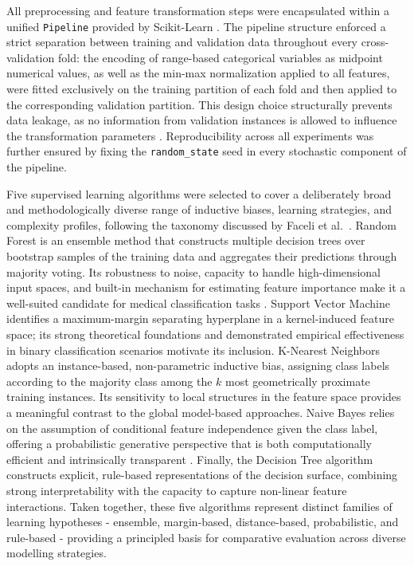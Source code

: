 All preprocessing and feature transformation steps were encapsulated within a unified
\texttt{Pipeline} provided by Scikit-Learn \cite{pedregosa2011sklearn}. The pipeline structure
enforced a strict separation between training and validation data throughout every
cross-validation fold: the encoding of range-based categorical variables as midpoint numerical
values, as well as the min-max normalization applied to all features, were fitted exclusively on
the training partition of each fold and then applied to the corresponding validation partition.
This design choice structurally prevents data leakage, as no information from validation instances
is allowed to influence the transformation parameters \cite{faceli2011}. Reproducibility across
all experiments was further ensured by fixing the \texttt{random\_state} seed in every stochastic
component of the pipeline.

Five supervised learning algorithms were selected to cover a deliberately broad and methodologically
diverse range of inductive biases, learning strategies, and complexity profiles, following the
taxonomy discussed by Faceli et al.~\cite{faceli2011}. Random Forest \cite{breiman2001randomforests}
is an ensemble method that constructs multiple decision trees over bootstrap samples of the training
data and aggregates their predictions through majority voting. Its robustness to noise, capacity to
handle high-dimensional input spaces, and built-in mechanism for estimating feature importance make
it a well-suited candidate for medical classification tasks \cite{deo2015}. Support Vector
Machine \cite{cortesvapnik1995} identifies a maximum-margin separating hyperplane in a
kernel-induced feature space; its strong theoretical foundations and demonstrated empirical
effectiveness in binary classification scenarios motivate its inclusion. K-Nearest
Neighbors \cite{cover1967nearest} adopts an instance-based, non-parametric inductive bias,
assigning class labels according to the majority class among the $k$ most geometrically proximate
training instances. Its sensitivity to local structures in the feature space provides a meaningful
contrast to the global model-based approaches. Naive Bayes relies on the assumption of conditional
feature independence given the class label, offering a probabilistic generative perspective that is
both computationally efficient and intrinsically transparent \cite{faceli2011,mitchell1997}. Finally,
the Decision Tree algorithm \cite{quinlan1986} constructs explicit, rule-based representations of the
decision surface, combining strong interpretability with the capacity to capture non-linear feature
interactions. Taken together, these five algorithms represent distinct families of learning
hypotheses - ensemble, margin-based, distance-based, probabilistic, and rule-based - providing a
principled basis for comparative evaluation across diverse modelling strategies.


